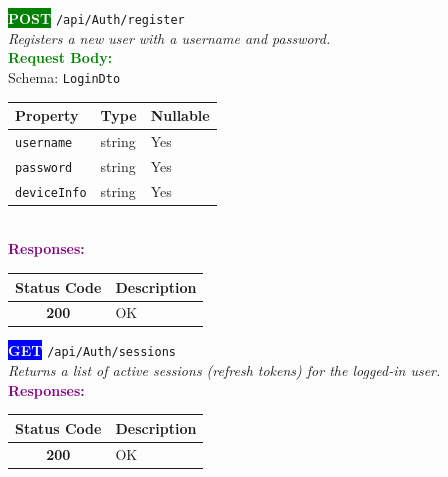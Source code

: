 \begin{tcolorbox}[
    colback=green!5,
    colframe=green,
    arc=2mm,
    boxrule=1pt,
    left=5pt,
    right=5pt,
    top=5pt,
    bottom=5pt
]
\noindent\colorbox{green}{\textcolor{white}{\textbf{POST}}} 
\texttt{\large /api/Auth/register}\\[0.3em]
\textit{Registers a new user with a username and password.}\\[0.3em]
\vspace{0.3em}
\textbf{\textcolor{green}{Request Body:}}\\[0.2em]
Schema: \texttt{LoginDto}\\[0.3em]
\begin{tabular}{|l|l|l|}
\hline
\rowcolor{green!10}
\textbf{Property} & \textbf{Type} & \textbf{Nullable} \\ \hline
\texttt{username} & string & Yes \\ \hline
\rowcolor{gray!5}
\texttt{password} & string & Yes \\ \hline
\texttt{deviceInfo} & string & Yes \\ \hline
\end{tabular}\\[0.5em]
\vspace{0.3em}
\textbf{\textcolor{purple}{Responses:}}\\[0.2em]
\begin{tabular}{|c|p{10cm}|}
\hline
\rowcolor{gray!20}
\textbf{Status Code} & \textbf{Description} \\ \hline
\colorbox{green!20}{\textbf{200}} & OK \\ \hline
\end{tabular}
\end{tcolorbox}
\vspace{0.5em}

\begin{tcolorbox}[
    colback=blue!5,
    colframe=blue,
    arc=2mm,
    boxrule=1pt,
    left=5pt,
    right=5pt,
    top=5pt,
    bottom=5pt
]
\noindent\colorbox{blue}{\textcolor{white}{\textbf{GET}}} 
\texttt{\large /api/Auth/sessions}\\[0.3em]
\textit{Returns a list of active sessions (refresh tokens) for the logged-in user.}\\[0.3em]
\vspace{0.3em}
\textbf{\textcolor{purple}{Responses:}}\\[0.2em]
\begin{tabular}{|c|p{10cm}|}
\hline
\rowcolor{gray!20}
\textbf{Status Code} & \textbf{Description} \\ \hline
\colorbox{green!20}{\textbf{200}} & OK \\ \hline
\end{tabular}
\end{tcolorbox}
\vspace{0.5em}

